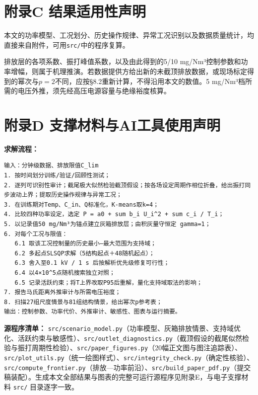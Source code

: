 \documentclass[UTF8,zihao=5,a4paper]{ctexart}
\begin{document}
\section*{附录C 结果适用性声明}

本文的功率模型、工况划分、历史操作规律、异常工况识别以及数据质量统计，均直接来自附件，可用\texttt{src/}中的程序复算。

排放层的各项系数、振打峰值系数，以及由此得到的5/10 mg/Nm³控制参数和功率增幅，则属于机理推演。若数据提供方给出新的未截顶排放数据，或现场标定得到的幂次与$p=2$不同，应按§8.2重新计算，不得沿用本文的数值。5 mg/Nm³档所需的电压外推，须先经高压电源容量与绝缘裕度核算。

\section*{附录D 支撑材料与AI工具使用声明}

\textbf{求解流程：}

\begin{lstlisting}[style=pseudo]
输入：分钟级数据、排放限值C_lim
1. 按时间划分训练/验证/回顾性测试；
2. 逐列可识别性审计；截尾极大似然检验截顶假设；按各场设定周期作相位折叠，给出振打同步波动上界；提取历史操作规律与异常工况；
3. 在训练期对Temp、C_in、Q标准化，K-means取k=4；
4. 比较四种功率设定，选定 P = a0 + sum b_i U_i^2 + sum c_i / T_i；
5. 以记录值50 mg/Nm³为锚点建立灰箱排放层；由积灰量守恒定 gamma=1；
6. 对每个工况与限值：
   6.1 取该工况控制量的历史最小—最大范围为支持域；
   6.2 多起点SLSQP求解（5结构起点＋48随机起点）；
   6.3 舍入至0.1 kV / 1 s 后按解析优先级修复可行性；
   6.4 以4×10^5点随机搜索独立对照；
   6.5 记录活跃约束；将T上界改取P95后重解，量化支持域取法的影响；
7. 报告马氏距离外推审计与所需电压裕度；
8. 扫描27组尺度情景与81组结构情景，给出幂次p参考表；
输出：控制参数、功率代价、外推审计、敏感性、图表与运行摘要。
\end{lstlisting}

\textbf{源程序清单：} \texttt{src/scenario\_model.py}（功率模型、灰箱排放情景、支持域优化、活跃约束与敏感性）、\texttt{src/outlet\_diagnostics.py}（截顶假设的截尾似然检验与振打周期性检验）、\texttt{src/paper\_figures.py}（20幅正文图与图注追踪表）、\texttt{src/plot\_utils.py}（统一绘图样式）、\texttt{src/integrity\_check.py}（确定性核验）、\texttt{src/compute\_frontier.py}（排放—功率前沿）、\texttt{src/build\_paper\_pdf.py}（提交稿装配）。生成本文全部结果与图表的完整可运行源程序见附录E，与电子支撑材料 \texttt{src/} 目录逐字一致。
\end{document}

